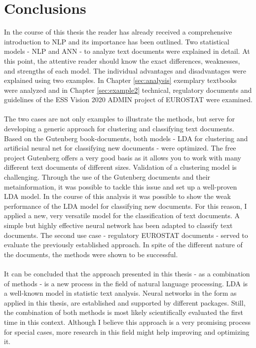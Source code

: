 \documentclass[11pt,a4paper]{article}
\begin{document}
\section{Conclusions} \label{sec:conclusions}

In the course of this thesis the reader has already received a comprehensive introduction to NLP and its importance has been outlined. Two statistical models - NLP and ANN - to analyze text documents were explained in detail. At this point, the attentive reader should know the exact differences, weaknesses, and strengths of each model. The individual advantages and disadvantages were explained using two examples. In Chapter \ref{sec:analysis} exemplary textbooks were analyzed and in Chapter \ref{sec:example2} technical, regulatory documents and guidelines of the ESS Vision 2020 ADMIN project of EUROSTAT were examined.\\
\ \\
The two cases are not only examples to illustrate the methods, but serve for developing a generic approach for clustering and classifying text documents. Based on the Gutenberg book-documents, both models - LDA for clustering and artificial neural net for classifying new documents - were optimized. The free project Gutenberg offers a very good basis as it allows you to work with many different text documents of different sizes. Validation of a clustering model is challenging. Through the use of the Gutenberg documents and their metainformation, it was possible to tackle this issue and set up a well-proven LDA model. In the course of this analysis it was possible to show the weak performance of the LDA model for classifying new documents. For this reason, I applied a new, very versatile model for the classification of text documents. A simple but highly effective neural network has been adapted to classify text documents. The second use case - regulatory EUROSTAT documents - served to evaluate the previously established approach. In spite of the different nature of the documents, the methods were shown to be successful. \\
\ \\
It can be concluded that the approach presented in this thesis - as a combination of methods - is a new process in the field of natural language processing. LDA is a well-known model in statistic text analysis. Neural networks in the form as applied in this thesis, are established and supported by different packages. Still, the combination of both methods is most likely scientifically evaluated the first time in this context. Although I believe this approach is a very promising process for special cases, more research in this field might help improving and optimizing it.\\
\end{document}
